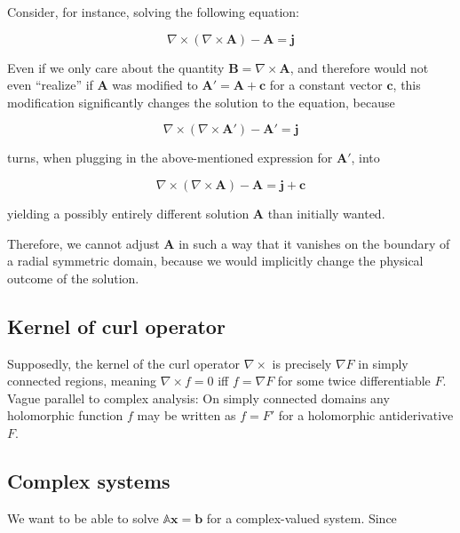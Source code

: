 \documentclass[11pt, a4paper]{article}
\begin{document}
Consider, for instance, solving the following equation:

\begin{equation}
    \nabla \times (\nabla \times \mathbf{A}) - \mathbf{A} = \mathbf{j}
\end{equation}

Even if we only care about the quantity $\mathbf{B} = \nabla \times \mathbf{A}$,
and therefore would not even \enquote{realize} if $\mathbf{A}$ was modified to
$\mathbf{A}' = \mathbf{A} + \mathbf{c}$ for a constant vector $\mathbf{c}$, this
modification significantly changes the solution to the equation, because 

\begin{equation}
    \nabla \times (\nabla \times \mathbf{A}') - \mathbf{A}' = \mathbf{j}
\end{equation}

turns, when plugging in the above-mentioned expression for $\mathbf{A}'$, into 

\begin{equation}
    \nabla \times (\nabla \times \mathbf{A}) - \mathbf{A} = \mathbf{j} + \mathbf{c}
\end{equation}

yielding a possibly entirely different solution $\mathbf{A}$ than initially wanted.

Therefore, we cannot adjust $\mathbf{A}$ in such a way that it vanishes on the
boundary of a radial symmetric domain, because we would implicitly change the 
physical outcome of the solution.

\subsection{Kernel of curl operator}
\label{subsec:curl}

Supposedly, the kernel of the curl operator $\nabla \times$ is precisely
$\nabla F$ in simply connected regions, meaning $\nabla \times f = 0$ iff 
$f = \nabla F$ for some twice differentiable $F$. Vague parallel to complex 
analysis:  On simply connected domains any holomorphic function $f$ may be written
as $f = F'$ for a holomorphic antiderivative $F$.

\subsection{Complex systems}
\label{subsec:complex}

We want to be able to solve $\mathbb{A} \mathbf{x} = \mathbf{b}$ for a complex-valued
system. Since 
\end{document}
